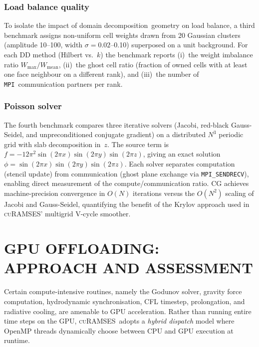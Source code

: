 \documentclass[fleqn,usenatbib]{mnras}
\newcommand{\curamses}{\textsc{cuRAMSES}}
\newcommand{\ksec}{\ensuremath{k}\text{-section}}
\newcommand{\mpi}[0]{\texttt{MPI}}
\newcommand{\dd}[0]{{domain decomposition}}
\begin{document}
\subsubsection{Load balance quality}
\label{sec:bench_lb}

To isolate the impact of \dd\ geometry on load balance,
a third benchmark assigns non-uniform cell weights drawn from 20
Gaussian clusters (amplitude 10--100, width $\sigma=0.02$--0.10)
superposed on a unit background.  For each DD method (Hilbert vs.\
\ksec) the benchmark reports (i)~the weight imbalance ratio
$W_{\max}/W_{\mathrm{mean}}$, (ii)~the ghost cell ratio (fraction of
owned cells with at least one face neighbour on a different rank), and
(iii)~the number of \mpi\ communication partners per rank.

\subsubsection{Poisson solver}
\label{sec:bench_poisson}

The fourth benchmark compares three iterative solvers (Jacobi,
red-black Gauss-Seidel, and unpreconditioned conjugate gradient)
on a distributed $N^3$ periodic grid with slab decomposition in~$z$.
The source term is $f = -12\pi^2 \sin(2\pi x)\sin(2\pi y)\sin(2\pi z)$,
giving an exact solution $\phi = \sin(2\pi x)\sin(2\pi y)\sin(2\pi z)$.
Each solver separates computation (stencil update) from communication
(ghost plane exchange via \texttt{MPI\_SENDRECV}), enabling direct
measurement of the compute/communication ratio.  CG achieves
machine-precision convergence in $O(N)$ iterations versus the $O(N^2)$
scaling of Jacobi and Gauss-Seidel, quantifying the benefit of the
Krylov approach used in \curamses' multigrid V-cycle smoother.


\section{GPU OFFLOADING: APPROACH AND ASSESSMENT}
\label{sec:hybrid}
Certain compute-intensive routines, namely the Godunov solver, gravity force
computation, hydrodynamic synchronisation, CFL timestep, prolongation,
and radiative cooling, are amenable to GPU acceleration.  Rather than
running entire time steps on the GPU, \curamses\ adopts a
\emph{hybrid dispatch} model where OpenMP threads dynamically choose
between CPU and GPU execution at runtime.
\end{document}
